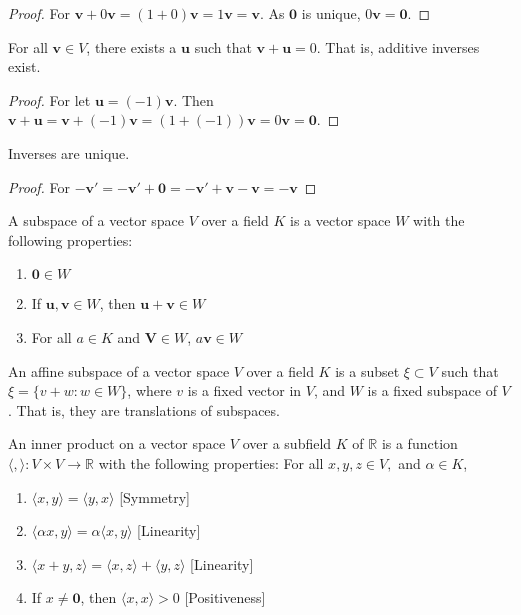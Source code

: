 \documentclass[crop=false,class=article,oneside]{standalone}
\begin{document}
        \begin{proof}
        For $\mathbf{v}+0\mathbf{v} = (1+0)\mathbf{v} = 1\mathbf{v} = \mathbf{v}$. As $\mathbf{0}$ is unique, $0\mathbf{v}=\mathbf{0}$.
        \end{proof}
        \begin{theorem}
        For all $\mathbf{v}\in V$, there exists a $\mathbf{u}$ such that $\mathbf{v}+\mathbf{u}=0$. That is, additive inverses exist.
        \end{theorem}
        \begin{proof}
        For let $\mathbf{u} = (-1)\mathbf{v}$. Then $\mathbf{v}+\mathbf{u} = \mathbf{v}+(-1)\mathbf{v} = (1+(-1))\mathbf{v} = 0\mathbf{v} = \mathbf{0}$.
        \end{proof}
        \begin{theorem}
        Inverses are unique.
        \end{theorem}
        \begin{proof}
        For $-\mathbf{v}'=-\mathbf{v}'+\mathbf{0}=-\mathbf{v}'+\mathbf{v}-\mathbf{v}=- \mathbf{v}$
        \end{proof}
        \begin{definition}
        A subspace of a vector space $V$ over a field $K$ is a vector space $W$ with the following properties:
        \begin{enumerate}
            \item $\mathbf{0} \in W$
            \item If $\mathbf{u,v}\in W$, then $\mathbf{u}+\mathbf{v} \in W$
            \item For all $a\in K$ and $\mathbf{V} \in W$, $a\mathbf{v} \in W$
        \end{enumerate}
        \end{definition}
        \begin{definition}
        An affine subspace of a vector space $V$ over a field $K$ is a subset $\xi\subset V$ such that $\xi = \{v+w:w\in W\}$, where $v$ is a fixed vector in $V$, and $W$ is a fixed subspace of $V$. That is, they are translations of subspaces.
        \end{definition}
        \begin{definition}
        An inner product on a vector space $V$ over a subfield $K$ of $\mathbb{R}$ is a function $\langle , \rangle:V\times V\rightarrow \mathbb{R}$ with the following properties: For all $x,y,z \in V,$ and $\alpha \in K$,
        \begin{enumerate}
            \item $\langle x,y \rangle = \langle y,x \rangle$ \hfill [Symmetry]
            \item $\langle \alpha x, y \rangle = \alpha \langle x,y \rangle$ \hfill [Linearity]
            \item $\langle x+y,z \rangle = \langle x,z\rangle + \langle y,z \rangle$ \hfill [Linearity]
            \item  If $x\ne \mathbf{0}$, then $\langle x,x\rangle >0$ \hfill [Positiveness]
        \end{enumerate}
        \end{definition}
\end{document}
